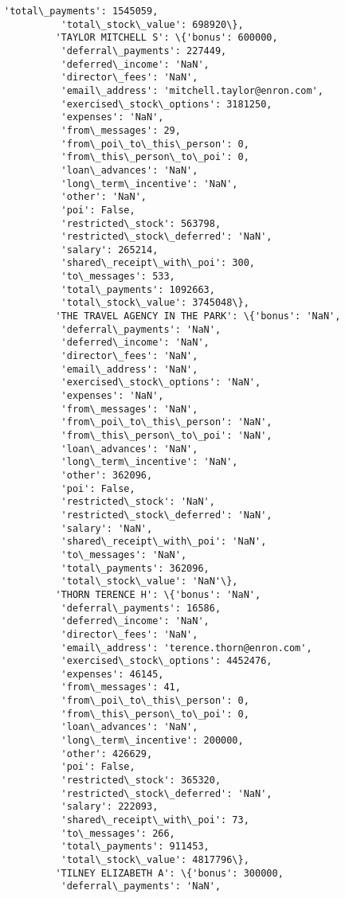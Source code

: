 \documentclass[11pt]{article}
\begin{document}
\begin{Verbatim}[commandchars=\\\{\}]
          'total\_payments': 1545059,
          'total\_stock\_value': 698920\},
         'TAYLOR MITCHELL S': \{'bonus': 600000,
          'deferral\_payments': 227449,
          'deferred\_income': 'NaN',
          'director\_fees': 'NaN',
          'email\_address': 'mitchell.taylor@enron.com',
          'exercised\_stock\_options': 3181250,
          'expenses': 'NaN',
          'from\_messages': 29,
          'from\_poi\_to\_this\_person': 0,
          'from\_this\_person\_to\_poi': 0,
          'loan\_advances': 'NaN',
          'long\_term\_incentive': 'NaN',
          'other': 'NaN',
          'poi': False,
          'restricted\_stock': 563798,
          'restricted\_stock\_deferred': 'NaN',
          'salary': 265214,
          'shared\_receipt\_with\_poi': 300,
          'to\_messages': 533,
          'total\_payments': 1092663,
          'total\_stock\_value': 3745048\},
         'THE TRAVEL AGENCY IN THE PARK': \{'bonus': 'NaN',
          'deferral\_payments': 'NaN',
          'deferred\_income': 'NaN',
          'director\_fees': 'NaN',
          'email\_address': 'NaN',
          'exercised\_stock\_options': 'NaN',
          'expenses': 'NaN',
          'from\_messages': 'NaN',
          'from\_poi\_to\_this\_person': 'NaN',
          'from\_this\_person\_to\_poi': 'NaN',
          'loan\_advances': 'NaN',
          'long\_term\_incentive': 'NaN',
          'other': 362096,
          'poi': False,
          'restricted\_stock': 'NaN',
          'restricted\_stock\_deferred': 'NaN',
          'salary': 'NaN',
          'shared\_receipt\_with\_poi': 'NaN',
          'to\_messages': 'NaN',
          'total\_payments': 362096,
          'total\_stock\_value': 'NaN'\},
         'THORN TERENCE H': \{'bonus': 'NaN',
          'deferral\_payments': 16586,
          'deferred\_income': 'NaN',
          'director\_fees': 'NaN',
          'email\_address': 'terence.thorn@enron.com',
          'exercised\_stock\_options': 4452476,
          'expenses': 46145,
          'from\_messages': 41,
          'from\_poi\_to\_this\_person': 0,
          'from\_this\_person\_to\_poi': 0,
          'loan\_advances': 'NaN',
          'long\_term\_incentive': 200000,
          'other': 426629,
          'poi': False,
          'restricted\_stock': 365320,
          'restricted\_stock\_deferred': 'NaN',
          'salary': 222093,
          'shared\_receipt\_with\_poi': 73,
          'to\_messages': 266,
          'total\_payments': 911453,
          'total\_stock\_value': 4817796\},
         'TILNEY ELIZABETH A': \{'bonus': 300000,
          'deferral\_payments': 'NaN',

\end{Verbatim}
\end{document}
